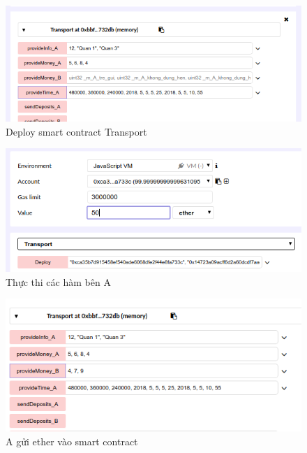 \begin{figure}[tph]
	\centering
	\includegraphics[width=14cm]{snapshot/5.png}
	\vspace{0.3cm}
	\caption{Deploy smart contract Transport}
	\label{fig:fig5}
\end{figure}

\begin{figure}[tph]
	\centering
	\includegraphics[width=14cm]{snapshot/6.png}
	\vspace{0.3cm}
	\caption{Thực thi các hàm bên A}
	\label{fig:fig6}
\end{figure}

\begin{figure}[tph]
	\centering
	\includegraphics[width=14cm]{snapshot/7.png}
	\vspace{0.3cm}
	\caption{A gửi ether vào smart contract}
	\label{fig:fig7}
\end{figure}

